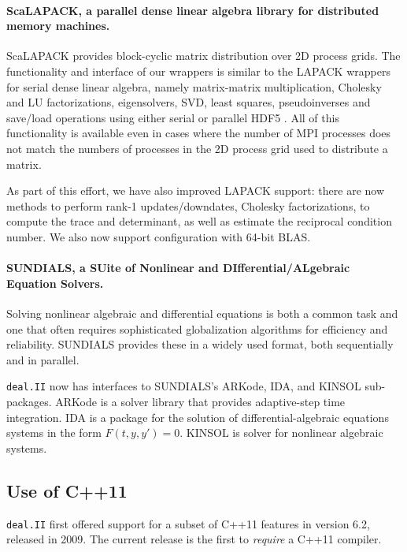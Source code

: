 \documentclass{ansarticle-preprint}
\newcommand{\specialword}[1]{\texttt{#1}}
\newcommand{\dealii}{{\specialword{deal.II}}\xspace}
\begin{document}
\paragraph*{ScaLAPACK, a parallel dense linear algebra library for distributed memory machines.}
  ScaLAPACK \cite{slug} provides block-cyclic matrix distribution over 2D
  process grids. The functionality and interface of our wrappers is similar
  to the LAPACK \cite{lapack} wrappers for serial dense linear algebra, namely
  matrix-matrix multiplication, Cholesky and LU factorizations,
  eigensolvers, SVD, least squares, pseudoinverses and save/load operations using
  either serial or parallel HDF5 \cite{hdf5}. All of this functionality is available
  even in cases where the number of MPI processes does not match the numbers of
  processes in the 2D process grid used to distribute a matrix.

  As part of this effort, we have also improved LAPACK support: there
  are now methods to perform rank-1 updates/downdates, Cholesky
  factorizations, to compute the trace and determinant, as well as
  estimate the reciprocal condition number. We also now support
  configuration with 64-bit BLAS.

\paragraph*{SUNDIALS, a SUite of Nonlinear and DIfferential/ALgebraic
  Equation Solvers.}
  Solving nonlinear algebraic and differential equations is both a
  common task and one that often requires sophisticated globalization
  algorithms for efficiency and reliability. SUNDIALS \cite{sundials}
  provides these in a widely used format, both sequentially and in parallel.

  \dealii now has interfaces to SUNDIALS's ARKode, IDA, and KINSOL sub-packages.
  ARKode is a solver library that provides adaptive-step time
  integration. IDA is a package for the solution of differential-algebraic
  equations systems in the form $F(t,y,y')=0$. KINSOL is solver for nonlinear
  algebraic systems.

  \subsection{Use of C++11}
  \label{sec:cxx11}
\dealii first offered support for a subset of C++11 features in
version 6.2, released in 2009. The current release is the first to
\emph{require} a C++11 compiler.
\end{document}
